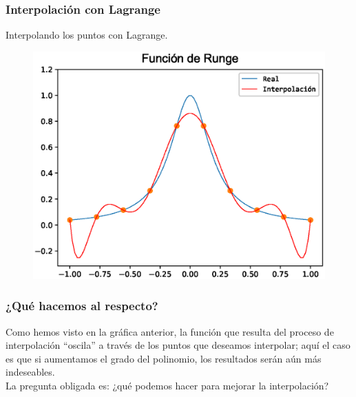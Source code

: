 \begin{frame}
\frametitle{Interpolación con Lagrange}
Interpolando los puntos con Lagrange.
\begin{figure}
	\centering
	\includegraphics[scale=0.5]{Imagenes/Funcion_Runge_2017_02.eps} 
\end{figure}
\end{frame}
\begin{frame}
\frametitle{¿Qué hacemos al respecto?}
Como hemos visto en la gráfica anterior, la función que resulta del proceso de interpolación ``oscila'' a través de los puntos que deseamos interpolar; aquí el caso es que si aumentamos el grado del polinomio, los resultados serán aún más indeseables.
\\
\medskip
La pregunta obligada es: ¿qué podemos hacer para mejorar la interpolación?
\end{frame}

